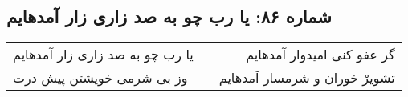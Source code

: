 \begin{center}
\section*{شماره ۸۶: یا رب چو به صد زاری زار آمدهایم}
\label{sec:086}
\begin{longtable}{l p{0.5cm} r}
یا رب چو به صد زاری زار آمدهایم
&&
گر عفو کنی امیدوار آمدهایم
\\
وز بی شرمی خویشتن پیش درت
&&
تشویرْ خوران و شرمسار آمدهایم
\\
\end{longtable}
\end{center}
